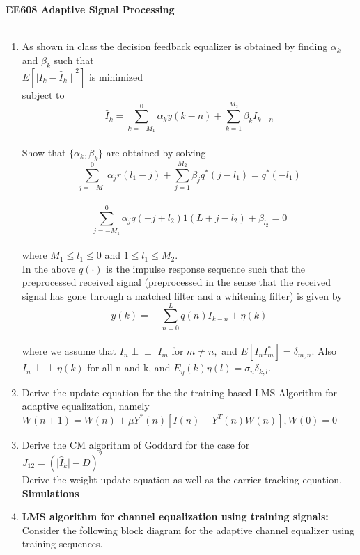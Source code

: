 \documentclass[journal,12pt,onecolumn]{IEEEtran}
\begin{document}
\centering \textbf{EE608  Adaptive Signal Processing}\\
\medskip
{}\\
\medskip
\begin{enumerate}
\item As shown in class the decision feedback equalizer is obtained by finding $\alpha_k $ and $ \beta_k$ such that\\
$E[{\mid{I_k}-{\hat{I}_k}\mid}^2]$ is minimized\\
\bigskip
subject to
$${\hat{I}}_k=\sum_{k={-M_1}}^0{\alpha_k}y(k-n)+\sum_{k=1}^{M_2}{\beta_k}{I_{k-n}}$$\\
\bigskip
Show that $\{\alpha_k,\beta_k\}$ are obtained by solving\\
\medskip
$$\sum_{j=-{M_1}}^{0}{\alpha_j}r(l_1-j)+\sum_{j=1}^{M_2}{\beta_j}q^*(j-l_1)=q^*(-l_1)$$\\
\bigskip
$$\sum_{j=-{M_1}}^{0}{\alpha_j}q(-j+l_2)1(L+j-l_2)+\beta_{l_2}=0$$\\
\bigskip
where $M_1\leq {l_1}\leq 0$ and $1\leq{l_1}\leq M_2.$\\
In the above $q(\cdot)$ is the impulse response sequence such that the preprocessed received signal (preprocessed in the
sense that the received signal has gone through a matched filter and a whitening filter) is given by\\
\medskip
$$y(k)= \quad\sum_{n=0}^{L}q(n)I_{k-n}+\eta(k)$$\\
\bigskip
where we assume that $I_n \perp\!\!\!\perp $ $I_m$ for $m \neq n,$ and $E[I_nI_m^{*}]=\delta_{m,n}.$ Also $I_n \perp\!\!\!\perp \eta(k)$ for all n and k, and $E_\eta(k)\eta(l)=\sigma_n\delta_{k,l}.$   
\medskip
\item Derive the update equation for the the training based LMS Algorithm for adaptive equalization, namely\\
\bigskip
$W(n+1)=W(n)+\mu {Y^*(n)}[I(n)-Y^T(n)W(n)],W(0)=0$\\
\medskip
\item Derive the CM algorithm of Goddard for the case for\\
\medskip
$J_{12}={(\vert\hat{I}_k\vert -D)}^2$\\
Derive the weight update equation as well as the carrier tracking equation.\\
\textbf{Simulations}
\item \textbf{LMS algorithm for channel equalization using training signals:}\\
Consider the following block diagram for the adaptive channel equalizer using training sequences.\\

\end{enumerate}
\end{document}
